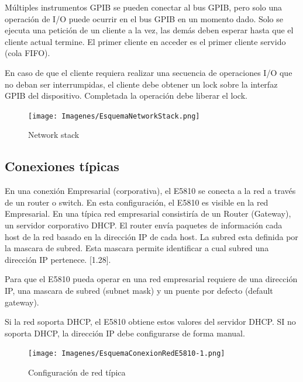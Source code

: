 Múltiples instrumentos GPIB se pueden conectar al bus GPIB, pero solo una operación de I/O puede ocurrir en el bus GPIB en un momento dado. Solo se ejecuta una petición de un cliente a la vez, las demás deben esperar hasta que el cliente actual termine. El primer cliente en acceder es el primer cliente servido (cola FIFO).

En caso de que el cliente requiera realizar una secuencia de operaciones I/O que no deban ser interrumpidas, el cliente debe obtener un lock sobre la interfaz GPIB del dispositivo. Completada la operación debe liberar el lock.

\begin{figure}
	\centering
	\begin{minipage}{11.501cm}				
		\texttt{[image: Imagenes/EsquemaNetworkStack.png]}
		\caption{Network stack}
		\label{Fig:NetworkStack}
	\end{minipage}
\end{figure}

\subsection{Conexiones típicas}

En una conexión Empresarial (corporativa), el E5810 se conecta a la red a través de un router o switch. En esta	configuración, el E5810 es visible en la red Empresarial. En una típica red empresarial consistiría de un Router (Gateway), un servidor corporativo DHCP. El router envía paquetes de información cada host de la red basado en la dirección IP de cada host. La subred esta definida por la mascara de subred. Esta mascara permite identificar a cual subred una dirección IP pertenece. [1.28].

Para que el E5810 pueda operar en una red empresarial requiere de una dirección IP, una mascara de subred (subnet mask) y un puente por defecto (default gateway). 

Si la red soporta DHCP, el E5810 obtiene estos valores del servidor DHCP. SI no soporta DHCP, la dirección IP debe configurarse de forma manual.

\begin{figure}
	\centering
	\begin{minipage}{8.841cm}
		\texttt{[image: Imagenes/EsquemaConexionRedE5810-1.png]}
		\caption{Configuración de red típica}
		\label{Fig:ConfiguracionRedE5810-1}
	\end{minipage}
\end{figure}

